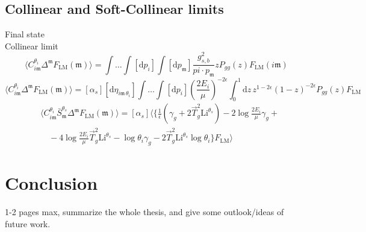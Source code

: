 \documentclass[a4paper, 12pt]{book}
\newcommand{\um}{\mathfrak{m}}
\begin{document}
\section{Collinear and Soft-Collinear limits}

Final state \\
Collinear limit
\begin{equation}
  \langle C_{i\um}^{\theta_i} \Delta^\um F_{\mathrm{LM}} (\um) \rangle = \int \dots \int [\mathrm{d}p_i] \int [\mathrm{d}p_\um] \frac{g^2_{s,b}}{pi \cdot p_\um} z P_{gg}(z) F_{\mathrm{LM}}(i \um)
\end{equation}
\begin{equation}
  \langle C_{i\um}^{\theta_i} \Delta^\um F_{\mathrm{LM}} (\um) \rangle = [\alpha_s] [\mathrm{d}\eta_{i\um \, \theta_i}] \int \dots \int [\mathrm{d}p_i] \left( \frac{2 E_i}{\mu}\right)^{-2 \epsilon} \int_0^1 \mathrm{d}z \, z^{1-2\epsilon} (1-z)^{-2\epsilon} P_{gg}(z) F_{\mathrm{LM}}
\end{equation}
\begin{equation}
  \begin{split}
  &\langle C_{i\mathfrak{m}}^{\theta_i} \bar{S}_{\mathfrak{m}}^{\theta_s} \Delta^{\mathfrak{m}} F_{\mathrm{LM}}(\mathfrak{m})\rangle = [\alpha_s] \langle \bigg\{ \frac{1}{\epsilon}(\gamma_g + 2 \vec{T}_g^2 \mathrm{Li}^{\theta_s}) - 2 \log{\frac{2 E_i}{\mu}}\gamma_g + \\ 
  & \quad - 4 \log{\frac{2 E_i}{\mu}}\vec{T}_g^2 \mathrm{Li}^{\theta_s} - \log{\theta_i} \gamma_g - 2 \vec{T}_g^2 \mathrm{Li}^{\theta_s} \log{\theta_i} \bigg\} F_{\mathrm{LM}} \rangle
  \end{split}
\end{equation}

\clearpage

\chapter{Conclusion}
1-2 pages max, summarize the whole thesis, and give some outlook/ideas of future work.

\clearpage
\end{document}
